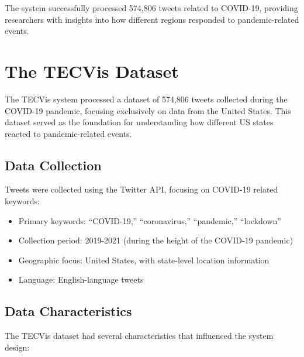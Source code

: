 The system successfully processed 574,806 tweets related to COVID-19, providing researchers with insights into how different regions responded to pandemic-related events.


\section{The TECVis Dataset}

The TECVis system processed a dataset of 574,806 tweets collected during the COVID-19 pandemic, focusing exclusively on data from the United States. This dataset served as the foundation for understanding how different US states reacted to pandemic-related events.

\subsection{Data Collection}

Tweets were collected using the Twitter API, focusing on COVID-19 related keywords:
\begin{itemize}
\item Primary keywords: ``COVID-19,'' ``coronavirus,'' ``pandemic,'' ``lockdown''
\item Collection period: 2019-2021 (during the height of the COVID-19 pandemic)
\item Geographic focus: United States, with state-level location information
\item Language: English-language tweets
\end{itemize}

\subsection{Data Characteristics}

The TECVis dataset had several characteristics that influenced the system design:

